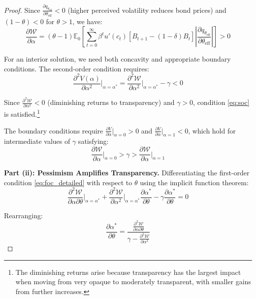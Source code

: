 \documentclass[12pt]{article}
\theoremstyle{plain}
\begin{document}
\begin{proof}
	Since $\frac{\partial q_{\theta_{\text{eff}}}}{\partial \theta_{\text{eff}}} <
		0$ (higher perceived volatility reduces bond prices) and $(1-\theta) < 0$ for
	$\theta > 1$, we have:
	\begin{equation}
		\frac{\partial \mathcal{W}}{\partial \alpha} = (\theta-1) \mathbb{E}_0 \left[ \sum_{t=0}^\infty \beta^t u'(c_t) [B_{t+1} - (1-\delta)B_t] \left|\frac{\partial q_{\theta_{\text{eff}}}}{\partial \theta_{\text{eff}}}\right| \right] > 0 \label{eq:marginal_benefit}
	\end{equation}

	For an interior solution, we need both concavity and appropriate boundary
	conditions. The second-order condition requires:
	\begin{equation}
		\frac{\partial^2 V(\alpha)}{\partial \alpha^2}\bigg|_{\alpha=\alpha^*} = \frac{\partial^2 \mathcal{W}}{\partial \alpha^2}\bigg|_{\alpha=\alpha^*} - \gamma < 0 \label{eq:soc}
	\end{equation}

	Since $\frac{\partial^2 \mathcal{W}}{\partial \alpha^2} < 0$ (diminishing
	returns to transparency) and $\gamma > 0$, condition \eqref{eq:soc} is
	satisfied.\footnote{The diminishing returns arise because transparency has the
		largest impact when moving from very opaque to moderately transparent, with
		smaller gains from further increases.}

	The boundary conditions require $\frac{\partial V}{\partial \alpha}|_{\alpha=0}
		> 0$ and $\frac{\partial V}{\partial \alpha}|_{\alpha=1} < 0$, which hold for
	intermediate values of $\gamma$ satisfying:
	\begin{equation}
		\frac{\partial \mathcal{W}}{\partial \alpha}\bigg|_{\alpha=0} > \gamma > \frac{\partial \mathcal{W}}{\partial \alpha}\bigg|_{\alpha=1} \label{eq:gamma_bounds}
	\end{equation}

	\textbf{Part (ii): Pessimism Amplifies Transparency.}
	Differentiating the first-order condition \eqref{eq:foc_detailed} with respect to $\theta$ using the implicit function theorem:
	\begin{equation}
		\frac{\partial^2 \mathcal{W}}{\partial \alpha \partial \theta}\bigg|_{\alpha=\alpha^*} + \frac{\partial^2 \mathcal{W}}{\partial \alpha^2}\bigg|_{\alpha=\alpha^*} \frac{\partial \alpha^*}{\partial \theta} - \gamma \frac{\partial \alpha^*}{\partial \theta} = 0 \label{eq:ift_application}
	\end{equation}

	Rearranging:
	\begin{equation}
		\frac{\partial \alpha^*}{\partial \theta} = \frac{\frac{\partial^2 \mathcal{W}}{\partial \alpha \partial \theta}}{\gamma - \frac{\partial^2 \mathcal{W}}{\partial \alpha^2}} \label{eq:transparency_theta_derivative}
	\end{equation}


\end{proof}
\end{document}
